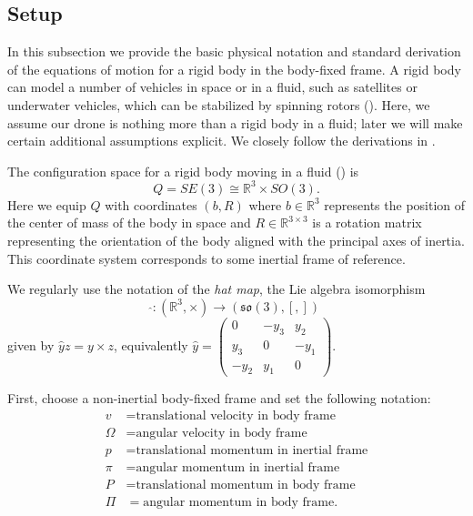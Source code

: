 \documentclass{aims}
\theoremstyle{definition}
\begin{document}
\subsection{Setup}
In this subsection we provide the basic physical notation and standard derivation of the equations of motion for a rigid body in the body-fixed frame.
A rigid body can model a number of vehicles in space or in a fluid, such as satellites or underwater vehicles, which can be stabilized by spinning rotors (\cite{Bloch1, Bloch3}).
Here, we assume our drone is nothing more than a rigid body in a fluid; later we will make certain additional assumptions explicit.  
We closely follow the derivations in \cite{DCDS, IJOC}.

The configuration space for a rigid body moving in a fluid (\cite{Bloch book}) is
$$Q=SE(3)\cong \mathbb R^3 \times SO(3).$$
Here we equip $Q$ with coordinates $(b,R)$ where $b\in \mathbb R^3$ represents the position of the center of mass of the body in space and $R\in \mathbb R^{3 \times 3}$ is a rotation matrix representing the orientation of the body aligned with the principal axes of inertia.  This coordinate system corresponds to some inertial frame of reference.

We regularly use the notation of the \textit{hat map}, the Lie algebra isomorphism
$$ \hat{} : (\mathbb R^3, \times) \to (\mathfrak{so}(3), [,])$$
given by $\hat{y}z = y \times z$, equivalently $\hat{y}=\begin{pmatrix}
0 & -y_3 & y_2 \\ y_3 & 0 & -y_1 \\ -y_2 & y_1 & 0
\end{pmatrix}$.


First, choose a non-inertial body-fixed frame %
and set the following notation:
\begin{align*}
v &= \text{translational velocity in body frame}\\
\Omega &= \text{angular velocity in body frame}\\
p &= \text{translational momentum in inertial frame}\\
\pi &= \text{angular momentum in inertial frame}\\
P &= \text{translational momentum in body frame}\\
\Pi &= \text{angular momentum in body frame}.
\end{align*}
\end{document}
